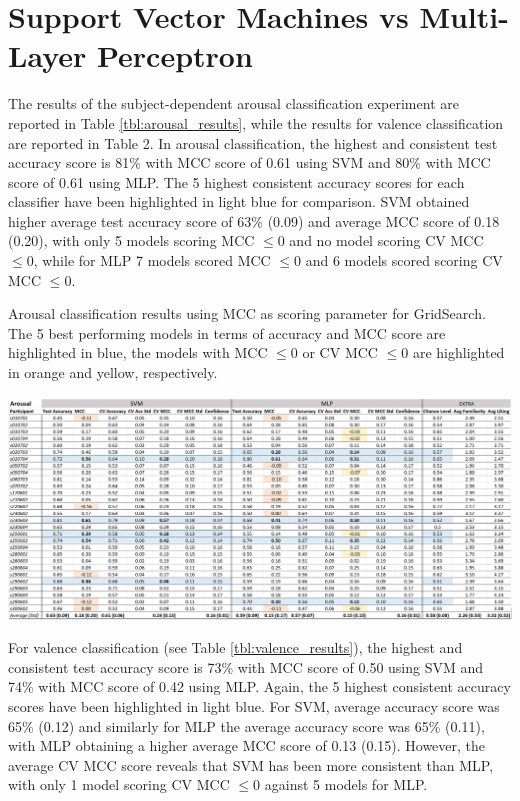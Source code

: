 \section{Support Vector Machines vs Multi-Layer Perceptron}
\label{sec:svm_mlp}
The results of the subject-dependent arousal classification experiment are reported in Table \ref{tbl:arousal_results}, while the results for valence classification are reported in Table 2. In arousal classification, the highest and consistent test accuracy score is 81\% with \ac{MCC} score of 0.61 using \ac{SVM} and 80\% with \ac{MCC} score of 0.61 using \ac{MLP}. The 5 highest consistent accuracy scores for each classifier have been highlighted in light blue for comparison. \ac{SVM} obtained higher average test accuracy score of 63\% (0.09) and average \ac{MCC} score of 0.18 (0.20), with only 5 models scoring \ac{MCC} \(\leq 0 \) and no model scoring \ac{CV MCC} \(\leq 0\), while for \ac{MLP}  7 models scored \ac{MCC} \(\leq 0\) and 6 models scored scoring \ac{CV MCC} \(\leq 0\).

\begin{table}[h!]
  \caption{Arousal classification results using MCC as scoring parameter for GridSearch. The 5 best performing models in terms of accuracy and MCC score are highlighted in blue, the models with MCC \(\leq 0 \) or CV MCC \(\leq 0\) are highlighted in orange and yellow, respectively.}
  \label{tbl:arousal_results}
  \includegraphics[width=\linewidth]{img/results/arousal_results.png}
\end{table}

For valence classification (see Table \ref{tbl:valence_results}), the highest and consistent test accuracy score is 73\% with \ac{MCC} score of 0.50 using \ac{SVM} and 74\% with \ac{MCC} score of 0.42 using \ac{MLP}. Again, the 5 highest consistent accuracy scores have been highlighted in light blue. For \ac{SVM}, average accuracy score was 65\% (0.12) and similarly for \ac{MLP} the average accuracy score was 65\% (0.11), with \ac{MLP} obtaining a higher average \ac{MCC} score of 0.13 (0.15). However, the average \ac{CV MCC} score reveals that \ac{SVM} has been more consistent than \ac{MLP}, with only 1 model scoring \ac{CV MCC} \(\leq 0 \) against 5 models for \ac{MLP}.

